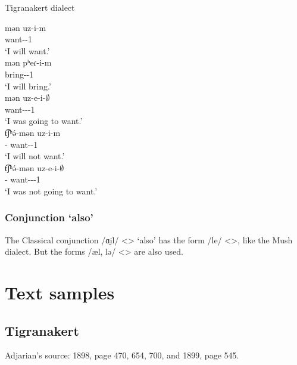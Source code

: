 \begin{exe}
	\ex Tigranakert dialect \label{sent:Tigranakert:morpho:verb:future}
	\begin{xlist}
		\ex \gll mən uz-i-m \\ 
		{\fut} want-{\thgloss}-1{\sg} \\ 
		\trans `I will want.' \\ 
		\ex \gll mən pʰeɾ-i-m \\ 
		{\fut} bring-{\thgloss}-1{\sg} \\ 
		\trans `I will bring.' \\ 
		\ex \gll mən uz-e-i-$\emptyset$ \\ 
		{\fut} want-{\thgloss}-{\pst}-1{\sg} \\ 
		\trans `I was going to want.' \\ 
		\ex \gll t͡ʃʰ\'ə-mən uz-i-m \\ 
		{\neggloss}-{\fut} want-{\thgloss}-1{\sg} \\ 
		\trans `I will not want.' \\ 
		\ex \gll t͡ʃʰ\'ə-mən uz-e-i-$\emptyset$ \\ 
		{\neggloss}-{\fut} want-{\thgloss}-{\pst}-1{\sg} \\ 
		\trans `I was not going to want.' \\ 
	\end{xlist}
\end{exe}

\subsubsection{Conjunction `also'} 

The Classical conjunction /ɑi̯l/ <> `also' has the form /le/ <>, like the Mush dialect. But the forms /æl, lə/ <> are also used. 



\section{Text samples}

{\sampleoverview}

\subsection{Tigranakert}
Adjarian's source:  1898, page 470, 654, 700, and 1899, page 545. 

